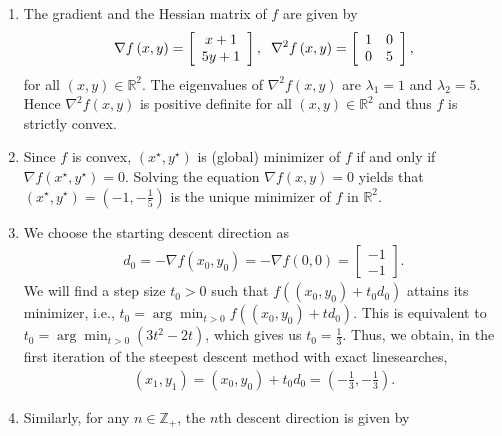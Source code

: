 \documentclass[a4paper]{article}
\numberwithin{equation}{section}
\begin{document}
\begin{enumerate}
\item The gradient and the Hessian matrix of $f$ are given by
\begin{align}
\nabla f\left( {x,y} \right) = \left[ {\begin{array}{*{20}{c}}
{x + 1}\\
{5y + 1}
\end{array}} \right], \hspace{0.2cm} {\nabla ^2}f\left( {x,y} \right) = \left[ {\begin{array}{*{20}{c}}
1&0\\
0&5
\end{array}} \right] ,
\end{align}
for all $\left( {x,y} \right) \in {\mathbb{R}^2}$. The eigenvalues of ${\nabla ^2}f\left( {x,y} \right)$ are $\lambda _1=1$ and $\lambda _2=5$. Hence ${\nabla ^2}f\left( {x,y} \right)$ is positive definite for all $\left(x,y\right)\in \mathbb{R}^2$ and thus $f$ is strictly convex.
\item Since $f$ is convex, $\left(x^\star,y^\star\right)$ is (global) minimizer of $f$ if and only if $\nabla f\left( {{x^\star},{y^\star}} \right) = 0$. Solving the equation $\nabla f\left( {x,y} \right) = 0$ yields that $\left(x^\star,y^\star\right) = \left(-1,-\frac{1}{5}\right)$ is the unique minimizer of $f$ in $\mathbb{R}^2$.
\item We choose the starting descent direction as
\begin{align}
{d_0} =  - \nabla f\left( {{x_0},{y_0}} \right) =  - \nabla f\left( {0,0} \right) = \left[ {\begin{array}{*{20}{c}}
{ - 1}\\
{ - 1}
\end{array}} \right].
\end{align}
We will find a step size $t_0>0$ such that $f\left( {\left( {{x_0},{y_0}} \right) + {t_0}{d_0}} \right)$ attains its minimizer, i.e., ${t_0} = \arg {\min _{t > 0}}f\left( {\left( {{x_0},{y_0}} \right) + t{d_0}} \right)$. This is equivalent to ${t_0} = \arg {\min _{t > 0}}\left( {3{t^2} - 2t} \right)$, which gives us $t_0=\frac{1}{3}$. Thus, we obtain, in the first iteration of the steepest descent method with exact linesearches,
\begin{align}
\left( {{x_1},{y_1}} \right) = \left( {{x_0},{y_0}} \right) + {t_0}{d_0} = \left( { - \frac{1}{3}, - \frac{1}{3}} \right).
\end{align}
\item Similarly, for any $n\in \mathbb{Z}_+$, the $n$th descent direction is given by

\end{enumerate}
\end{document}
